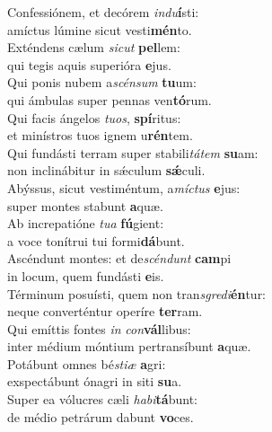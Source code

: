 \evenverse Confessiónem, et decórem \textit{in}\textit{du}\textbf{í}sti:~\*\\
\evenverse amíctus lúmine sicut vesti\textbf{mén}to.\\
\oddverse Exténdens cælum \textit{si}\textit{cut} \textbf{pel}lem:~\*\\
\oddverse qui tegis aquis superióra \textbf{e}jus.\\
\evenverse Qui ponis nubem a\textit{scén}\textit{sum} \textbf{tu}um:~\*\\
\evenverse qui ámbulas super pennas ven\textbf{tó}rum.\\
\oddverse Qui facis ángelos \textit{tu}\textit{os}, \textbf{spí}ritus:~\*\\
\oddverse et minístros tuos ignem u\textbf{rén}tem.\\
\evenverse Qui fundásti terram super stabili\textit{tá}\textit{tem} \textbf{su}am:~\*\\
\evenverse non inclinábitur in sǽculum \textbf{sǽ}culi.\\
\oddverse Abýssus, sicut vestiméntum, a\textit{mí}\textit{ctus} \textbf{e}jus:~\*\\
\oddverse super montes stabunt \textbf{a}quæ.\\
\evenverse Ab increpatióne \textit{tu}\textit{a} \textbf{fú}gient:~\*\\
\evenverse a voce tonítrui tui formi\textbf{dá}bunt.\\
\oddverse Ascéndunt montes: et de\textit{scén}\textit{dunt} \textbf{cam}pi~\*\\
\oddverse in locum, quem fundásti \textbf{e}is.\\
\evenverse Términum posuísti, quem non tran\textit{sgre}\textit{di}\textbf{én}tur:~\*\\
\evenverse neque converténtur operíre \textbf{ter}ram.\\
\oddverse Qui emíttis fontes \textit{in} \textit{con}\textbf{vál}libus:~\*\\
\oddverse inter médium móntium pertransíbunt \textbf{a}quæ.\\
\evenverse Potábunt omnes bé\textit{sti}\textit{æ} \textbf{a}gri:~\*\\
\evenverse exspectábunt ónagri in siti \textbf{su}a.\\
\oddverse Super ea vólucres cæli \textit{ha}\textit{bi}\textbf{tá}bunt:~\*\\
\oddverse de médio petrárum dabunt \textbf{vo}ces.\\
